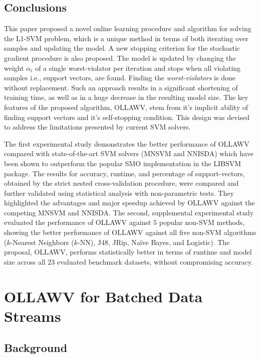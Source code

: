 \documentclass[reqno]{vcuthesis}
\numberwithin{equation}{chapter}
\begin{document}
\section{Conclusions}\label{sec:ollawvconclusion}
This paper proposed a novel online learning procedure and algorithm for solving the L1-SVM problem, which is a unique method in terms of both iterating over samples and updating the model. A new stopping criterion for the stochastic gradient procedure is also proposed. The model is updated by changing the weight $\alpha_i$ of a single worst-violator per iteration and stops when all violating samples i.e., support vectors, are found. Finding the \textit{worst-violators} is done without replacement. Such an approach results in a significant shortening of training time, as well as in a huge decrease in the resulting model size. The key features of the proposed algorithm, OLLAWV, stem from it's implicit ability of finding support vectors and it's self-stopping condition. This design was devised to address the limitations presented by current SVM solvers. 

The first experimental study demonstrates the better performance of OLLAWV compared with state-of-the-art SVM solvers (MNSVM and NNISDA) which have been shown to outperform the popular SMO implementation in the LIBSVM package. The results for accuracy, runtime, and percentage of support-vectors, obtained by the strict nested cross-validation procedure, were compared and further validated using statistical analysis with non-parametric tests. They highlighted the advantages and major speedup achieved by OLLAWV against the competing MNSVM and NNISDA. The second, supplemental experimental study evaluated the performance of OLLAWV against $5$ popular non-SVM methods, showing the better performance of OLLAWV against all five non-SVM algorithms ($k$-Nearest Neighbors ($k$-NN), J48, JRip, Na\"ive Bayes, and Logistic). The proposal, OLLAWV, performs statistically better in terms of runtime and model size across all $23$ evaluated benchmark datasets, without compromising accuracy.

\chapter{OLLAWV for Batched Data Streams}

\section{Background}
\end{document}
